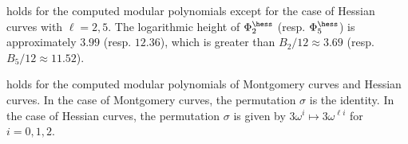 \documentclass{amsart}
\theoremstyle{definition}
\theoremstyle{remark}
\numberwithin{equation}{section}
\begin{document}
 holds
for the computed modular polynomials
except for the case of Hessian curves with $\ell = 2, 5$.
The logarithmic height of $\Phi_2^{\hess}$ (resp. $\Phi_5^{\hess}$) is approximately $3.99$
(resp. $12.36$),
which is greater than $B_2/12 \approx 3.69$ (resp. $B_5/12 \approx 11.52$).

 holds for
the computed modular polynomials of Montgomery curves and Hessian curves.
In the case of Montgomery curves,
the permutation $\sigma$ is the identity.
In the case of Hessian curves,
the permutation $\sigma$ is given by
$3\omega^i \mapsto 3\omega^{\ell i}$
for $i = 0, 1, 2$.


\end{document}
